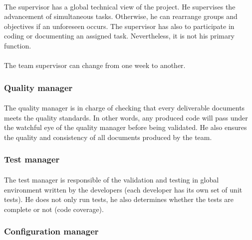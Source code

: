 \documentclass{report}
\begin{document}
\paragraph{}
\hspace{4mm}\textnormal{The supervisor has a global technical view of the project. He supervises the advancement of simultaneous tasks. Otherwise, he can rearrange groups and objectives if an unforeseen occurs. The supervisor has also to participate in coding or documenting an assigned task. Nevertheless, it is not his primary function.}

\paragraph{}
\hspace{4mm}\textnormal{The team supervisor can change from one week to another.}

\subsubsection{Quality manager}

\paragraph{}
\hspace{4mm}\textnormal{The quality manager is in charge of checking that every deliverable documents meets the quality standards. In other words, any produced code will pass under the watchful eye of the quality manager before being validated. He also ensures the quality and consistency of all documents produced by the team.}

\subsubsection{Test manager}

\paragraph{}
\hspace{4mm}\textnormal{The test manager is responsible of the validation and testing in global environment written by the developers (each developer has its own set of unit tests). He does not only run tests, he also determines whether the tests are complete or not (code coverage).}

\subsubsection{Configuration manager}
\end{document}
